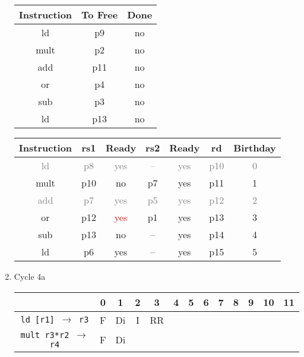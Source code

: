\documentclass[12pt]{article}
\begin{document}
\begin{enumerate}
\begin{table}[H]
\begin{tabular}{|c|c|c|c|c|c|c|c|c|c|c|c|c|c|c|}
				\end{tabular}
			\end{table}
			\begin{table}[H]
				\begin{tabular}{|c|c|c|}
					\hline
					Instruction & To Free & Done\\
					\hline
					ld & p9 & no\\
					\hline
					mult & p2 & no\\
					\hline
					add & p11 & no\\
					\hline
					or & p4 & no\\
					\hline
					sub & p3 & no\\
					\hline
					ld & p13 & no\\
					\hline
				\end{tabular}
				\hfill
				\begin{tabular}{|c|c|c|c|c|c|c|}
					\hline
					Instruction & rs1 & Ready & rs2 & Ready & rd & Birthday\\
					\hline
					\textcolor{gray}{ld} & \textcolor{gray}{p8} & \textcolor{gray}{yes} & \textcolor{gray}{--} & \textcolor{gray}{yes} & \textcolor{gray}{p10} & \textcolor{gray}{0}\\
					\hline
					mult & p10 & no & p7 & yes & p11 & 1\\
					\hline
					\textcolor{gray}{add} & \textcolor{gray}{p7} & \textcolor{gray}{yes} & \textcolor{gray}{p5} & \textcolor{gray}{yes} & \textcolor{gray}{p12} & \textcolor{gray}{2}\\
					\hline
					or & p12 & \textcolor{red}{yes} & p1 & yes & p13 & 3\\
					\hline
					sub & p13 & no & -- & yes & p14 & 4\\
					\hline
					ld & p6 & yes & -- & yes & p15 & 5\\
					\hline
				\end{tabular}
			\end{table}
		\item
			Cycle 4a
			\begin{table}[H]
				\begin{tabular}{|c|c|c|c|c|c|c|c|c|c|c|c|c|}
					\hline
					 & 0 & 1 & 2 & 3 & 4 & 5 & 6 & 7 & 8 & 9 & 10 & 11\\
					\hline
					\texttt{ld [r1] $\rightarrow$ r3} & F & Di & I & RR &  &  &  &  &  &  &  &\\
					\hline
					\texttt{mult r3*r2 $\rightarrow$ r4} & F & Di &  &  &  &  &  &  &  &  &  &\\
					\hline

\end{tabular}
\end{table}
\end{enumerate}
\end{document}

